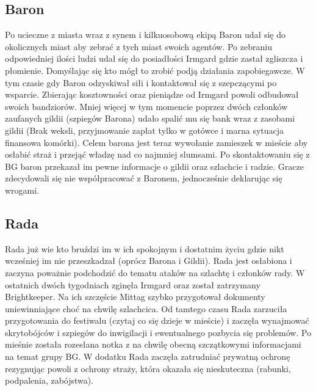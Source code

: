 \documentclass{article}
\begin{document}
\subsection*{Baron}
    Po ucieczne z miasta wraz z synem i kilkuosobową ekipą Baron udał się do okolicznych miast aby zebrać z tych miast swoich agentów. Po zebraniu odpowiedniej ilości ludzi udał się do posiadłości Irmgard gdzie zastał zgliszcza i płomienie. Domyślając się kto mógł to zrobić podją działania zapobiegawcze. W tym czasie gdy Baron odzyskiwał siłi i kontaktował się z szepczącymi po wsparcie. Zbierając kosztowności oraz pieniądze od Irmgard powoli odbudował swoich bandziorów. Mniej więcej w tym momencie poprzez dwóch członków zaufanych gildii (szpiegów Barona) udało spalić mu się bank wraz z zasobami gildii (Brak weksli, przyjmowanie zapłat tylko w gotówce i marna sytuacja finansowa komórki). Celem barona jest teraz wywołanie zamieszek w mieście aby osłabić straż i przejąć władzę nad co najmniej slumsami. Po skontaktowaniu się z BG baron przekazał im pewne informacje o gildii oraz szlachcie i radzie. Gracze zdecydowali się nie współpracować z Baronem, jednocześnie deklarując się wrogami. 

\subsection*{Rada}
    Rada już wie kto bruździ im w ich spokojnym i dostatnim życiu gdzie nikt wcześniej im nie przeszkadzał (oprócz Barona i Gildii). Rada jest osłabiona i zaczyna poważnie podchodzić do tematu ataków na szlachtę i członków rady. W ostatnich dwóch tygodniach zginęła Irmgard oraz został zatrzymany Brightkeeper. Na ich szczęście Mittag szybko przygotował dokumenty uniewinniające choć na chwilę szlachcica. Od tamtego czasu Rada zarzuciła przygotowania do festiwalu (czytaj co się dzieje w mieście) i zaczęła wynajmować skrytobójców i szpiegów do inwigilacji i ewentualnego pozbycia się problemów. Po mieśnie została rozesłana notka z na chwilę obecną szczątkowymi informacjami na temat grupy BG. W dodatku Rada zaczęła zatrudniać prywatną ochronę rezygnując powoli z ochrony straży, która okazała się nieskuteczna (rabunki, podpalenia, zabójstwa). 
\end{document}
